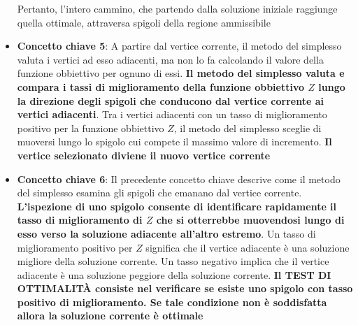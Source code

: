 \documentclass[12pt]{article}
\begin{document}
\begin{itemize}
    Pertanto, l'intero cammino, che partendo dalla soluzione iniziale raggiunge quella ottimale, attraversa spigoli della regione ammissibile
    \item \textbf{Concetto chiave 5}: A partire dal vertice corrente, il metodo del simplesso valuta i vertici ad esso adiacenti, ma non lo fa calcolando il valore della funzione obbiettivo per ognuno di essi.
    \textbf{Il metodo del simplesso valuta e compara i tassi di miglioramento della funzione obbiettivo $Z$ lungo la direzione degli spigoli che conducono dal vertice corrente ai vertici adiacenti}.
    Tra i vertici adiacenti con un tasso di miglioramento positivo per la funzione obbiettivo $Z$, il metodo del simplesso sceglie di muoversi lungo lo spigolo cui compete il massimo valore di incremento.
    \textbf{Il vertice selezionato diviene il nuovo vertice corrente}
    \item \textbf{Concetto chiave 6}: Il precedente concetto chiave descrive come il metodo del simplesso esamina gli spigoli che emanano dal vertice corrente.
    \textbf{L'ispezione di uno spigolo consente di identificare rapidamente il tasso di miglioramento di $Z$ che si otterrebbe muovendosi lungo di esso verso la soluzione adiacente all'altro estremo}.
    Un tasso di miglioramento positivo per $Z$ significa che il vertice adiacente è una soluzione migliore della soluzione corrente. Un tasso negativo implica che il vertice adiacente è una soluzione peggiore della soluzione corrente.
    \textbf{Il TEST DI OTTIMALITÀ consiste nel verificare se esiste uno spigolo con tasso positivo di miglioramento. Se tale condizione non è soddisfatta allora la soluzione corrente è ottimale}
\end{itemize}
\end{document}
